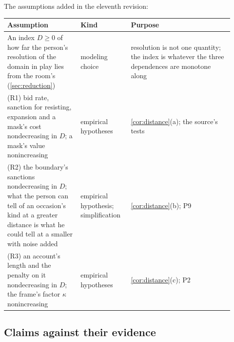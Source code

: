 \noindent The assumptions added in the eleventh revision:
\begin{center}\small
\begin{tabular}{p{0.3\linewidth} p{0.2\linewidth} p{0.42\linewidth}}
\toprule
Assumption & Kind & Purpose \\
\midrule
An index $D \ge 0$ of how far the person's resolution of the domain in play lies from the room's (\autoref{sec:reduction}) & modeling choice & resolution is not one quantity; the index is whatever the three dependences are monotone along \\
(R1) bid rate, sanction for resisting, expansion and a mask's cost nondecreasing in $D$; a mask's value nonincreasing & empirical hypotheses & \autoref{cor:distance}(a); the source's tests \\
(R2) the boundary's sanctions nondecreasing in $D$; what the person can tell of an occasion's kind at a greater distance is what he could tell at a smaller with noise added & empirical hypothesis; simplification & \autoref{cor:distance}(b); P9 \\
(R3) an account's length and the penalty on it nondecreasing in $D$; the frame's factor $\kappa$ nonincreasing & empirical hypotheses & \autoref{cor:distance}(c); P2 \\
\bottomrule
\end{tabular}
\end{center}

\subsection{Claims against their evidence}

